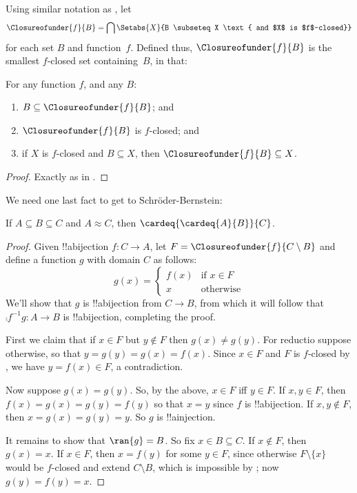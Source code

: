 Using similar notation as ,
let
\[
\Closureofunder{f}{B} = \bigcap \Setabs{X}{B \subseteq X 
\text{ and $X$ is $f$-closed}}
\]
for each set $B$ and function~$f$. Defined thus,
$\Closureofunder{f}{B}$ is the smallest $f$-closed set containing~$B$,
in that:

\begin{lem}
	For any function $f$, and any $B$:
	\begin{enumerate}
		\item{} $B \subseteq \Closureofunder{f}{B}$; and
		\item{} $\Closureofunder{f}{B}$ is $f$-closed; and
		\item{} if $X$ is $f$-closed and $B
		\subseteq X$, then $\Closureofunder{f}{B} \subseteq X$.
	\end{enumerate}
\end{lem}

\begin{proof}
Exactly as in .
\end{proof}

We need one last fact to get to Schr\"oder-Bernstein:

\begin{prop}
If $A \subseteq B \subseteq C$ and $A \approx C$, then $\cardeq{\cardeq{A}{B}}{C}$.
\end{prop}

\begin{proof}
Given !!a{bijection}  $f \colon C \to A$, let $F =
\Closureofunder{f}{C \setminus B}$ and define a function $g$ with
domain $C$ as follows:
\[
	g(x) = 
	\begin{cases}
			f(x) &\text{if $x \in F$}\\
			x & \text{otherwise}
		\end{cases}
\]
We'll show that $g$ is !!a{bijection} from $C \to B$, from which it
will follow that $\comp{f^{-1}}{g} \colon A \to B$ is !!a{bijection},
completing the proof.

First we claim that if $x \in F$ but $y\notin F$ then $g(x) \neq
g(y)$. For reductio suppose otherwise, so that $y = g(y) = g(x) =
f(x)$. Since $x \in F$ and $F$ is $f$-closed by ,
we have $y = f(x) \in F$, a contradiction. 

Now suppose $g(x) = g(y)$. So, by the above, $x \in F$ iff $y \in F$.
If $x, y \in F$, then $f(x) = g (x) = g(y) = f(y)$ so that $x = y$
since $f$ is !!a{bijection}. If  $x, y \notin F$, then $x = g(x) =
g(y) = y$. So $g$ is !!a{injection}.

It remains to show that $\ran{g} = B$. So fix $x \in B \subseteq C$.
If $x \notin F$, then $g(x) = x$. If $x \in F$, then $x = f(y)$ for
some $y \in F$, since otherwise $F \setminus \{x\}$ would be $f$-closed and extend $C\setminus B$, which is impossible by ; now $g(y) = f(y) = x$.
\end{proof}

